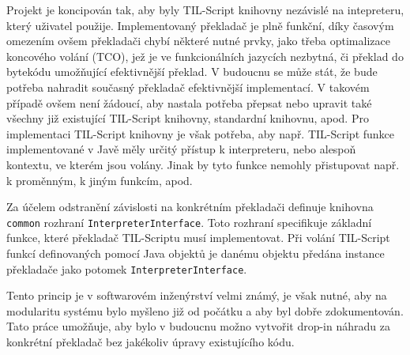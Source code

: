 Projekt je koncipován tak, aby byly TIL-Script knihovny nezávislé na intepreteru, který uživatel
použije. Implementovaný překladač je plně funkční, díky časovým omezením ovšem překladači chybí
některé nutné prvky, jako třeba optimalizace koncového volání (TCO), jež je ve funkcionálních
jazycích nezbytná, či překlad do bytekódu umožňující efektivnější překlad. V budoucnu se může stát,
že bude potřeba nahradit současný překladač efektivnější implementací. V takovém případě ovšem není
žádoucí, aby nastala potřeba přepsat nebo upravit také všechny již existující TIL-Script knihovny,
standardní knihovnu, apod. Pro implementaci TIL-Script knihovny je však potřeba, aby např.
TIL-Script funkce implementované v Javě měly určitý přístup k interpreteru, nebo alespoň kontextu,
ve kterém jsou volány. Jinak by tyto funkce nemohly přistupovat např. k proměnným, k jiným funkcím,
apod.

Za účelem odstranění závislosti na konkrétním překladači definuje knihovna \lstinline{common}
rozhraní \lstinline{InterpreterInterface}. Toto rozhraní specifikuje základní funkce, které
překladač TIL-Scriptu musí implementovat. Při volání TIL-Script funkcí definovaných pomocí Java
objektů je danému objektu předána instance překladače jako potomek \lstinline{InterpreterInterface}.

Tento princip je v softwarovém inženýrství velmi známý, je však nutné, aby na modularitu systému
bylo myšleno již od počátku a aby byl dobře zdokumentován. Tato práce umožňuje, aby bylo v budoucnu
možno vytvořit drop-in náhradu za konkrétní překladač bez jakékoliv úpravy existujícího kódu.

\endinput
